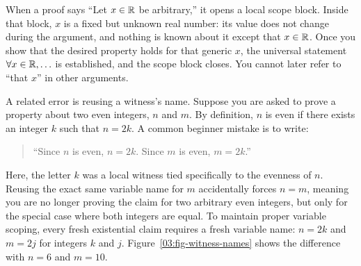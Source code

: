 When a proof says ``Let $x \in \mathbb{R}$ be arbitrary,'' it opens a local scope block. Inside that block, $x$ is a fixed but unknown real number: its value does not change during the argument, and nothing is known about it except that $x \in \mathbb{R}$. Once you show that the desired property holds for that generic $x$, the universal statement $\forall x \in \mathbb{R}, \ldots$ is established, and the scope block closes. You cannot later refer to ``that $x$'' in other arguments.

A related error is reusing a witness's name. Suppose you are asked to prove a property about two even integers, $n$ and $m$. By definition, $n$ is even if there exists an integer $k$ such that $n = 2k$. A common beginner mistake is to write:
\begin{quote}
``Since $n$ is even, $n = 2k$. Since $m$ is even, $m = 2k$.''
\end{quote}
Here, the letter $k$ was a local witness tied specifically to the evenness of $n$. Reusing the exact same variable name for $m$ accidentally forces $n = m$, meaning you are no longer proving the claim for two arbitrary even integers, but only for the special case where both integers are equal. To maintain proper variable scoping, every fresh existential claim requires a fresh variable name: $n = 2k$ and $m = 2j$ for integers $k$ and $j$. Figure~\ref{03:fig-witness-names} shows the difference with $n = 6$ and $m = 10$.

